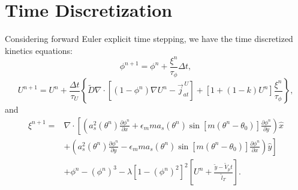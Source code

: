 \documentclass[10pt]{article}
\begin{document}
\section{Time Discretization}
Considering forward Euler explicit time stepping, we have the time discretized kinetics equations:
\begin{equation}
\phi^{n+1}=\phi^{n} + \frac{\xi^n}{\tau_\phi}\Delta t,
\end{equation}
\begin{equation}
U^{n+1}=U^{n}+\frac{\Delta t}{\tau_U}\left\{ \tilde{D}\nabla \cdot \left[ (1-\phi^n) \nabla U^n - \vec{j}_{at}^{\,U} \right] + [1+(1-k)U^n]\frac{\xi^n}{\tau_\phi} \right\},
\end{equation}
and
\begin{equation}
\begin{split}
\xi^{n+1} = & \nabla \cdot  \left[ \left(a_s^2(\theta^n) \frac{\partial \phi^n}{\partial x} + \epsilon_m m a_s(\theta^n) \sin \left[ m \left(\theta^n - \theta_0 \right) \right] \frac{\partial \phi^n}{\partial y}\right)\hat{x} \right. \\ 
& \left . + \left(a_s^2(\theta^n) \frac{\partial \phi^n}{\partial y} - \epsilon_m m a_s(\theta^n) \sin \left[ m \left(\theta^n - \theta_0 \right) \right] \frac{\partial \phi^n}{\partial x}\right)\hat{y}\right] \\
& +\phi^n-(\phi^n)^3 - \lambda \left[1-(\phi^n)^2\right]^2 \left[ U^n + \frac{\tilde{y}-\tilde{V}_p t}{\tilde{l}_T} \right].
\end{split}
\end{equation}
\end{document}

